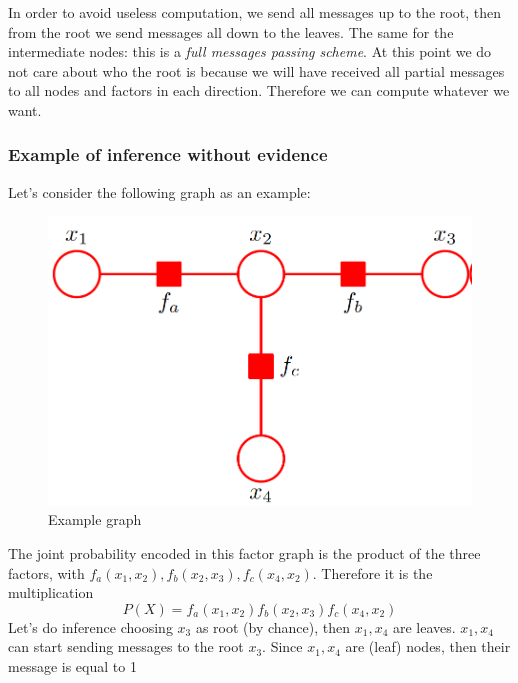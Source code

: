 
In order to avoid useless computation, we send all messages up to the root, then
from the root we send messages all down to the leaves. The same for the intermediate
nodes: this is a \textit{full messages passing scheme}. At this point we do not
care about who the root is because we will have received all partial messages to
all nodes and factors in each direction. Therefore we can compute whatever we want.\\

\subsubsection{Example of inference without evidence}
Let's consider the following graph as an example:
\begin{figure}[H]
	\centering
	\includegraphics[scale=0.25]{
		images/09_BayesianNetworksInference_exampleInference.png
	}
	\caption{Example graph}
	\label{fig:example_graph_inference_BN}
\end{figure}
The joint probability encoded in this factor graph is the product of the three factors,
with $f_{a}(x_{1}, x_{2}), f_{b}(x_{2}, x_{3}), f_{c}(x_{4}, x_{2})$. Therefore it
is the multiplication
\[
	P(X) = f_{a}(x_{1}, x_{2}) f_{b}(x_{2}, x_{3}) f_{c}(x_{4}, x_{2})
\]
Let's do inference choosing $x_{3}$ as root (by chance), then $x_{1}, x_{4}$ are
leaves. $x_{1}, x_{4}$ can start sending messages to the root $x_{3}$. Since
$x_{1}, x_{4}$ are (leaf) nodes, then their message is equal to 1
